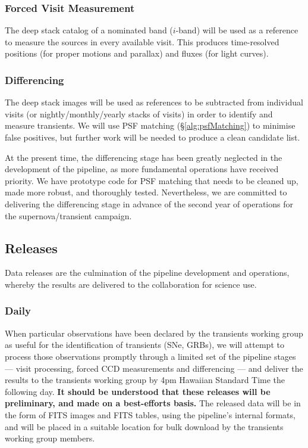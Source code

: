 \documentclass[12pt]{article}
\begin{document}
\subsubsection{Forced Visit Measurement}

The deep stack catalog of a nominated band ($i$-band) will be used as a reference to measure the sources in
every available visit.  This produces time-resolved positions (for proper motions and parallax) and fluxes
(for light curves).


\subsubsection{Differencing}

The deep stack images will be used as references to be subtracted from individual visits (or
nightly/monthly/yearly stacks of visits) in order to identify and measure transients.  We will use PSF matching
(\S\ref{alg:psfMatching}) to minimise false positives, but further work will be needed to produce a clean
candidate list.

At the present time, the differencing stage has been greatly neglected in the development of the pipeline, as
more fundamental operations have received priority.  We have prototype code for PSF matching that needs to be
cleaned up, made more robust, and thoroughly tested.  Nevertheless, we are committed to delivering the
differencing stage in advance of the second year of operations for the supernova/transient campaign.


\subsection{Releases}

Data releases are the culmination of the pipeline development and operations, whereby the results are delivered
to the collaboration for science use.

\subsubsection{Daily}

When particular observations have been declared by the transients working group as useful for the
identification of transients (SNe, GRBs), we will attempt to process those observations promptly through a
limited set of the pipeline stages --- visit processing, forced CCD measurements and differencing --- and
deliver the results to the transients working group by 4pm Hawaiian Standard Time the following day.  {\bf It
  should be understood that these releases will be preliminary, and made on a best-efforts basis.}  The
released data will be in the form of FITS images and FITS tables, using the pipeline's internal formats, and
will be placed in a suitable location for bulk download by the transients working group members.
\end{document}
